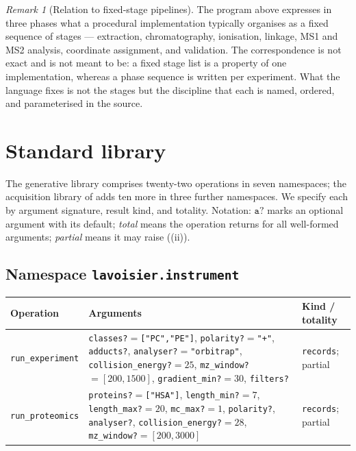 \documentclass[11pt,twocolumn,a4paper]{article}
\theoremstyle{ssthm}
\theoremstyle{definition}
\theoremstyle{remark}
\newtheorem{remark}[theorem]{Remark}
\newcommand{\shk}[1]{\texttt{#1}}
\begin{document}
\begin{remark}[Relation to fixed-stage pipelines]
\label{rem:stages}
The program above expresses in three phases what a procedural
implementation typically organises as a fixed sequence of stages ---
extraction, chromatography, ionisation, linkage, MS1 and MS2 analysis,
coordinate assignment, and validation. The correspondence is not exact
and is not meant to be: a fixed stage list is a property of one
implementation, whereas a phase sequence is written per experiment. What
the language fixes is not the stages but the discipline that each is
named, ordered, and parameterised in the source.
\end{remark}

\section{Standard library}
\label{sec:stdlib}

The generative library comprises twenty-two operations in seven
namespaces; the acquisition library of  adds ten
more in three further namespaces. We
specify each by argument signature, result kind, and totality.
Notation: $\shk{a?}$ marks an optional argument with its default;
\emph{total} means the operation returns for all well-formed arguments;
\emph{partial} means it may raise ((ii)).

\subsection{Namespace \shk{lavoisier.instrument}}

\begin{longtable}{@{}p{}p{}p{}@{}}
\toprule
\textbf{Operation} & \textbf{Arguments} & \textbf{Kind / totality}\\
\midrule
\endhead
\shk{run\_experiment} &
\shk{classes?}$=$\shk{["PC","PE"]}, \shk{polarity?}$=$\shk{"+"},
\shk{adducts?}, \shk{analyser?}$=$\shk{"orbitrap"},
\shk{collision\_energy?}$=25$, \shk{mz\_window?}$=[200,1500]$,
\shk{gradient\_min?}$=30$, \shk{filters?} &
\shk{records}; partial\\
\addlinespace
\shk{run\_proteomics} &
\shk{proteins?}$=$\shk{["HSA"]}, \shk{length\_min?}$=7$,
\shk{length\_max?}$=20$, \shk{mc\_max?}$=1$, \shk{polarity?},
\shk{analyser?}, \shk{collision\_energy?}$=28$, \shk{mz\_window?}$=[200,3000]$ &
\shk{records}; partial\\
\bottomrule
\end{longtable}
\end{document}
